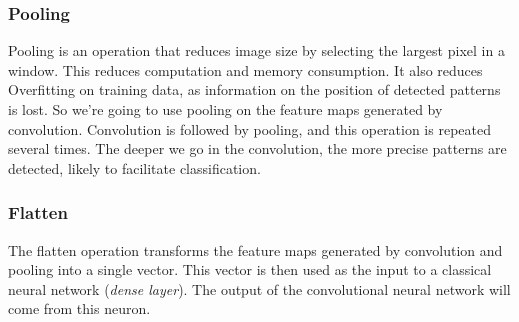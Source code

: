\subsubsection*{Pooling}
Pooling is an operation that reduces image size by selecting the largest pixel in a window. This reduces computation and memory consumption. It also reduces Overfitting on training data, as information on the position of detected patterns is lost. So we're going to use pooling on the feature maps generated by convolution. Convolution is followed by pooling, and this operation is repeated several times. The deeper we go in the convolution, the more precise patterns are detected, likely to facilitate classification.\\

\subsubsection*{Flatten}
The flatten operation transforms the feature maps generated by convolution and pooling into a single vector. This vector is then used as the input to a classical neural network (\emph{dense layer}). The output of the convolutional neural network will come from this neuron.

